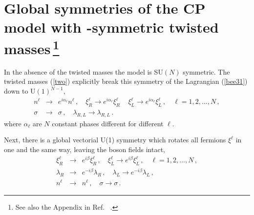 \documentclass[epsfig,12pt]{article}
\def\beqn{\begin{eqnarray}}
\def\eeqn{\end{eqnarray}}
\renewcommand{\theequation}{\thesection.\arabic{equation}}
\def\beqn{\begin{eqnarray}}
\def\eeqn{\end{eqnarray}}
\renewcommand{\theequation}{\thesection.\arabic{equation}}
\begin{document}
{\section
[Global symmetries of the CP\boldmath{$(N-1)$} model with \boldmath{$Z_{N}$}-symmetric
 twisted masses]
{Global symmetries of the CP model with -symmetric
 twisted masses\,\footnote{See also the Appendix in Ref.~ \cite{Shifman:2009ay}.}}
 \renewcommand{\theequation}{\Alph{section}.\arabic{equation}}
\setcounter{equation}{0}
 \renewcommand{\thesubsection}{\Alph{section}.\arabic{subsection}}
\setcounter{subsection}{0}
% 
\label{app:symm}

 In the absence of the twisted masses
the model is SU$(N)$ symmetric. The twisted masses (\ref{two}) explicitly break this symmetry 
of the Lagrangian (\ref{bee31}) down to U$(1)^{N-1}$,
\beqn
n^\ell&\to& e^{i\alpha_\ell}n^\ell\,,\quad \xi^\ell_R \to e^{i\alpha_\ell}\xi^\ell_R\,
\quad \xi^\ell_L \to e^{i\alpha_\ell}\xi^\ell_L\,,\quad \ell=1,2, ..., N\,,
\nonumber\\[2mm]
\sigma
&\to&
 \sigma\,,\quad \lambda_{R,L}\to \lambda_{R,L}\,.
 \label{appe9}
\eeqn
where $\alpha_\ell$ are $N$ constant phases different for different $\ell$. 

Next, there is a global vectorial U(1) symmetry which rotates all fermions $\xi^\ell$
in one and the same way, leaving the boson fields intact,
\beqn
\xi^\ell_R 
&\to& 
e^{i\beta}\xi^\ell_R\,, \quad
 \xi^\ell_L \to e^{i\beta}\xi^\ell_L\,,\quad \ell=1,2, ..., N\,,
\nonumber\\[2mm]
\lambda_R 
&\to&
 e^{-i\beta}\lambda_R\,,\quad 
\lambda_L \to e^{-i\beta}\lambda_L\,,
\nonumber\\[2mm]
n^\ell &\to& n^\ell\,,\quad \sigma\to\sigma\,.
\label{appeten}
\eeqn

}
\end{document}

